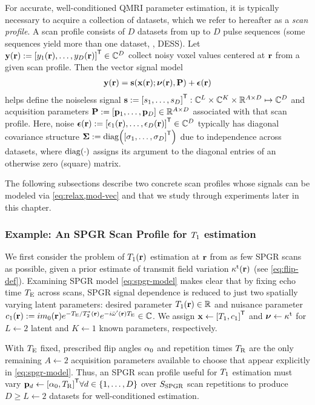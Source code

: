 For accurate, well-conditioned QMRI parameter estimation,
it is typically necessary 
to acquire a collection of datasets,
which we refer to hereafter as a \emph{scan profile}.
A scan profile consists 
of $D$ datasets
from up to $D$ pulse sequences
(some sequences yield more than one dataset, \eg, DESS).
Let 
$\bmy\pr := \brac{y_1\pr, \dots, y_D\pr}\tpose \in \complexes{D}$
collect noisy voxel values centered at $\mathbf{r}$
from a given scan profile.
Then the vector signal model
\begin{align}
	\bmy\pr = \bms\paren{\bmx\pr; \bmnu\pr, \bmP} + \bmeps\pr
	\label{eq:relax,mod-vec}
\end{align}
helps define the noiseless signal 
$\bms := \brac{s_1, \dots, s_D}\tpose
: \complexes{L} \times \complexes{K} \times \reals{A \times D} \mapsto \complexes{D}$
and acquisition parameters
$\bmP := \brac{\bmp_1,\dots,\bmp_D} \in \reals{A \times D}$
associated with that scan profile.
Here, noise
$\bmeps\pr := \brac{\epsilon_1\pr, \dots, \epsilon_D\pr}\tpose \in \complexes{D}$
typically has diagonal covariance structure
$\bmSig := \diag{\brac{\sigma_1,\dots,\sigma_D}\tpose}$
due to independence across datasets,
where $\diag{\cdot}$ assigns its argument 
to the diagonal entries 
of an otherwise zero (square) matrix.

The following subsections
describe two concrete scan profiles
whose signals can be modeled 
via \eqref{eq:relax,mod-vec} 
and that we study through experiments
later in this chapter.

\subsubsection{Example: An SPGR Scan Profile for $T_1$ estimation}
\label{sss,relax,meth,prof,t1}

We first consider the problem
of $\To\pr$ estimation at $\mathbf{r}$ 
from as few SPGR scans as possible,
given a prior estimate
of transmit field variation $\stx\pr$
(see \eqref{eq:flip-def}).
Examining SPGR model \eqref{eq:spgr-model}
makes clear that 
by fixing echo time $T_\mathrm{E}$ across scans, 
SPGR signal dependence is reduced 
to just two spatially varying latent parameters:
desired parameter $\To\pr \in \real$ and 
nuisance parameter 
$\const{1}\pr := i\mzero\pr e^{-\TE/\Tts\pr} e^{-i\ompmed\pr \TE} \in \complex$.
We assign $\bmx \gets \brac{\To, \const{1}}\tpose$ and $\boldsymbol{\nu} \gets \kappa^{\mathrm{t}}$
for $L \gets 2$ latent 
and $K \gets 1$ known parameters, respectively.

With $T_\mathrm{E}$ fixed, 
prescribed flip angles $\alpha_0$ 
and repetition times $T_\mathrm{R}$ 
are the only remaining $A \gets 2$ 
acquisition parameters
available to choose
that appear explicitly in \eqref{eq:spgr-model}.
Thus, an SPGR scan profile 
useful for $T_1$ estimation 
must vary 
$\bmp_d \gets \brac{\flipnom, \TR}\tpose
\forall d \in \set{1,\dots,D}$
over $S_{\mathrm{SPGR}}$ scan repetitions
to produce $D \geq L \gets 2$ datasets
for well-conditioned estimation.

